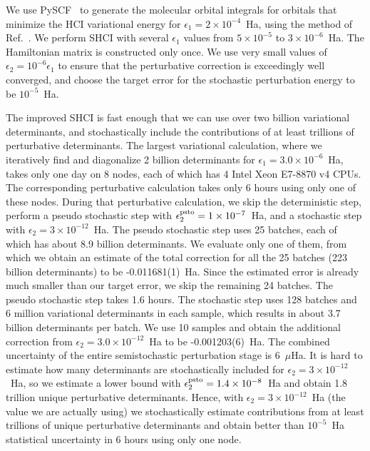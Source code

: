 \documentclass[%
preprint,
 superscriptaddress,
 amsmath,amssymb,
 aps,
]{revtex4-1}
\begin{document}
We use PySCF~\cite{SunCha_etal_PySCF-ComMolSci-18} to generate the molecular orbital integrals for orbitals that minimize the HCI variational
energy for $\epsilon_1=2\times 10^{-4}$~Ha, using the method of Ref.~\cite{SmiMusHolSha-JCTC-17}.
We perform SHCI with several $\epsilon_1$ values from $5\times10^{-5}$ to $3\times10^{-6}$~Ha.
The Hamiltonian matrix is constructed only once.
We use very small values of $\epsilon_2 = 10^{-6} \epsilon_1$  to ensure that the perturbative correction is exceedingly well converged,
and choose the target error for the stochastic perturbation energy to be $10^{-5}$~Ha.

The improved SHCI is fast enough that we can use over two billion variational determinants, and stochastically include the contributions of at least trillions of perturbative determinants.
The largest variational calculation, where we iteratively find and diagonalize 2 billion determinants
for $\epsilon_1=3.0\times10^{-6}$~Ha, takes only one day on 8 nodes, each of which has 4 Intel Xeon E7-8870 v4 CPUs.
The corresponding perturbative calculation takes only 6 hours using only one of these nodes. 
During that perturbative calculation, we skip the deterministic step, perform a pseudo stochastic step with $\epsilon_2^{\rm psto}=1\times10^{-7}$~Ha, and a stochastic step with $\epsilon_2=3\times10^{-12}$~Ha.
The pseudo stochastic step uses 25 batches, each of which has about 8.9 billion determinants.
We evaluate only one of them, from which we obtain an estimate of the total correction for all the 25 batches (223 billion determinants) to be -0.011681(1)~Ha.
Since the estimated error is already much smaller than our target error, we skip the remaining 24 batches.
The pseudo stochastic step takes 1.6 hours.
The stochastic step uses 128 batches and 6 million variational determinants in each sample,
which results in about 3.7 billion determinants per batch.
We use 10 samples and obtain the additional correction from $\epsilon_2=3.0\times10^{-12}$~Ha to be -0.001203(6)~Ha.
The combined uncertainty of the entire semistochastic perturbation stage is 6~$\mu$Ha.
It is hard to estimate how many determinants are stochastically included for $\epsilon_2=3\times10^{-12}$~Ha,
so we estimate a lower bound with $\epsilon_2^{\rm psto}=1.4\times10^{-8}$~Ha and obtain 1.8 trillion unique perturbative determinants.
Hence, with $\epsilon_2=3\times10^{-12}$~Ha (the value we are actually using) we stochastically estimate contributions from
at least trillions of unique perturbative determinants and obtain better than $10^{-5}$~Ha statistical uncertainty in 6 hours using only one node.
\end{document}

